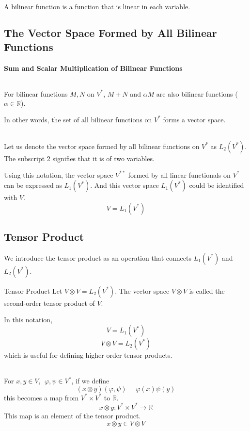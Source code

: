 \documentclass[uplatex,a4j,12pt,dvipdfmx]{jsarticle}
\begin{document}
A bilinear function is a function that is linear in each variable.

\subsection{The Vector Space Formed by All Bilinear Functions}

\paragraph{Sum and Scalar Multiplication of Bilinear Functions}

${}$

For bilinear functions $M, N$ on $V^{*}$,
$M + N$ and $\alpha M$ are also bilinear functions
($\alpha \in \mathbb{R}$).

In other words, the set of all bilinear functions on $V^{*}$ forms a vector space.

\ \\

Let us denote the vector space formed by all bilinear functions on $V^{*}$ as $L_{2}(V^{*})$.
The subscript 2 signifies that it is of two variables.

Using this notation, the vector space $V^{**}$ formed by all linear functionals on $V^{*}$ can be
expressed as $L_{1}(V^{*})$.
And this vector space $L_{1}(V^{*})$ could be identified with $V$.
$$
	V = L_{1}(V^{*})
$$

\subsection{Tensor Product}

We introduce the tensor product as an operation that connects $L_{1}(V^{*})$ and $L_{2}(V^{*})$.

\begin{itembox}[l]{Tensor Product}
	Let $V \otimes V = L_{2}(V^{*})$.
	The vector space $V \otimes V$ is called the second-order tensor product of $V$.
\end{itembox}

In this notation,
$$V = L_{1}(V^{*})$$
$$V \otimes V = L_{2}(V^{*})$$
which is useful for defining higher-order tensor products.

\ \\

For $x,y \in V, \ \ \varphi, \psi \in V^{*}$,
if we define
$$
	(x \otimes y)(\varphi, \psi) = \varphi(x) \psi(y)
$$
this becomes a map from
$V^{*} \times V^{*}$
to
$\mathbb{R}$.
$$
	x \otimes y : V^{*} \times V^{*} \to \mathbb{R}
$$
This map is an element of the tensor product.
$$
	x \otimes y \in V \otimes V
$$
\end{document}
